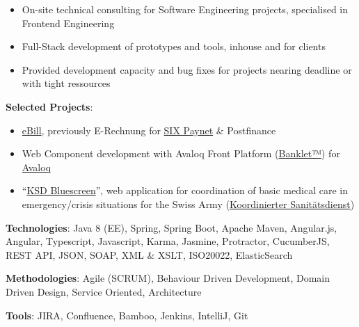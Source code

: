 \documentclass[10pt, a4paper, ragged2e]{altacv}
\begin{document}
\divider


\begin{itemize}
	\item On-site technical consulting for Software Engineering projects, specialised in Frontend Engineering
	\item Full-Stack development of prototypes and tools, inhouse and for clients
	\item Provided development capacity and bug fixes for projects nearing deadline or with tight ressources
\end{itemize}

\textbf{Selected Projects}:
\begin{itemize}
	\item \href{https://www.ebill.ch/}{eBill}, previously E-Rechnung for \href{https://www.six-group.com/en/site/banking-services/paynet.html}{SIX Paynet} \& Postfinance
	\item Web Component development with Avaloq Front Platform (\href{https://developer.avaloq.com/web/developer-portal/learn}{Banklet™}) for \href{https://www.avaloq.com/en/}{Avaloq}
	\item \enquote{\href{https://blog.alertswiss.ch/de/rubriken/bevoelkerungsschutz/koordinierter-sanitaetsdienst-ksd-neues-management-tool-blue-screen-switzerland/}{KSD Bluescreen}}, web application for coordination of basic medical care in emergency/crisis situations for the Swiss Army (\href{https://www.vtg.admin.ch/de/organisation/astab/san/ksd.html}{Koordinierter Sanitätsdienst})
\end{itemize}

\textbf{Technologies}: Java 8 (EE), Spring, Spring Boot, Apache Maven, Angular.js, Angular, Typescript, Javascript, Karma, Jasmine, Protractor, CucumberJS, REST API, JSON, SOAP, XML \& XSLT, ISO20022, ElasticSearch

\textbf{Methodologies}: Agile (SCRUM), Behaviour Driven Development, Domain Driven Design, Service Oriented, Architecture

\textbf{Tools}: JIRA, Confluence, Bamboo, Jenkins, IntelliJ, Git

\divider

\end{document}
